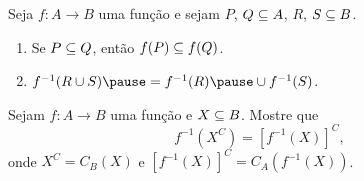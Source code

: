 \documentclass{beamer}
\begin{document}
    \begin{frame}
        \begin{proposicao}
            Seja $f : A \to B$ uma função \pause e sejam $P$, \pause $Q \subseteq A$, \pause $R$, \pause $S \subseteq B$.\pause
            \begin{enumerate}[label={\roman*})]
                \item Se $P \subseteq Q$, \pause então $f(P) \subseteq f(Q)$.\pause

                \vspace{.5cm}

                \item $f^{-1}(R \cup S) \pause = f^{-1}(R) \pause \cup f^{-1}(S)$.
            \end{enumerate}
        \end{proposicao}
    \end{frame}

    \begin{frame}
        Sejam $f : A \to B$ uma função e $X \subseteq B$. Mostre que
        \[ f^{-1}(X^C) = [f^{-1}(X)]^C, \]
        onde $X^C = C_B(X)$  e $[f^{-1}(X)]^C = C_A(f^{-1}(X))$.
    \end{frame}
\end{document}
